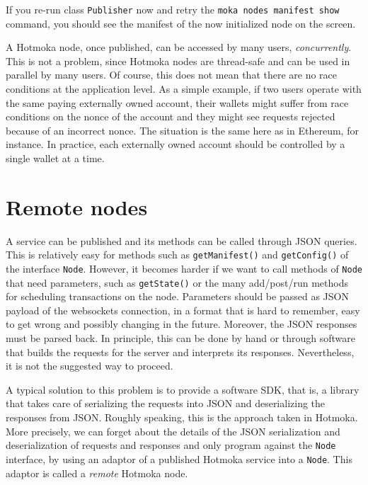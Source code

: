 If you re-run class \texttt{Publisher} now and retry the \texttt{moka nodes manifest show} command, you should see
the manifest of the now initialized node on the screen.
%
\begin{commentbox}
A Hotmoka node, once published, can be accessed by many
users, \emph{concurrently}. This is not a problem, since Hotmoka nodes are thread-safe and can
be used in parallel by many users. Of course, this does not mean that there are no
race conditions at the application level. As a simple example, if two users operate
with the same paying externally owned account, their wallets might suffer from race
conditions on the nonce of the account and they might see requests
rejected because of an incorrect nonce. The situation is the same here as in Ethereum,
for instance. In practice, each externally owned account should be controlled
by a single wallet at a time.
\end{commentbox}

\section{Remote nodes}\label{sec:remote_nodes}

A service can be published and its methods can be called through JSON queries.
This is relatively easy for methods such as \texttt{getManifest()} and
\texttt{getConfig()} of the interface \texttt{Node}. However, it
becomes harder if we want to call methods of \texttt{Node} that need parameters, such
as \texttt{getState()} or the many add/post/run methods for scheduling transactions on
the node. Parameters should be passed as JSON payload of the websockets connection, in a format
that is hard to remember, easy to get wrong and possibly changing in the future.
Moreover, the JSON responses must be parsed back.
In principle, this can be done by hand or through software that builds the
requests for the server and interprets its responses.
Nevertheless, it is not the suggested way to proceed.

A typical solution to this problem is to provide a software SDK, that is, a library
that takes care of serializing the requests into JSON and deserializing
the responses from JSON. Roughly speaking, this is the approach taken in Hotmoka.
More precisely, we can forget about the details of the JSON serialization
and deserialization of requests and responses and only program against the \texttt{Node} interface,
by using an adaptor of a published Hotmoka service into a \texttt{Node}. This adaptor is called
a \emph{remote} Hotmoka node.

